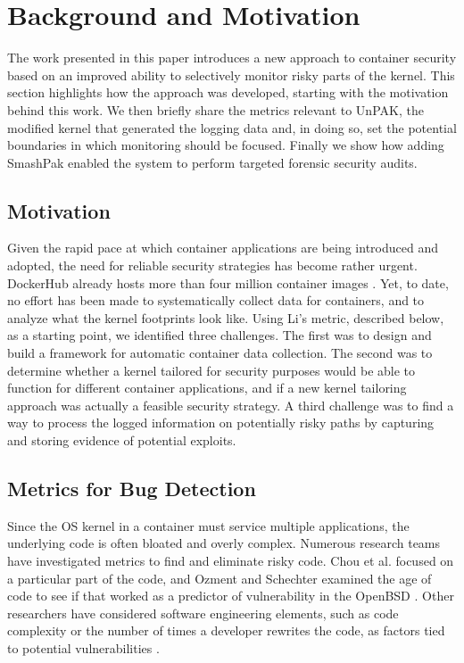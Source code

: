 \section{Background and Motivation}
\label{sec.motivation}
The work presented in this paper introduces a new approach to container security based on an improved ability to selectively monitor risky parts of the kernel. 
This section highlights how the approach was developed, starting with the motivation behind this work. We then briefly share the metrics relevant to UnPAK, 
the modified kernel that generated the logging data and, in doing so, set the potential boundaries in which monitoring should be focused. 
Finally we show how adding SmashPak enabled the system to perform targeted forensic security audits.

\subsection{Motivation}
\label{sec.motivation.motivation}
Given the rapid pace at which container applications are being introduced and adopted, the need for reliable security strategies has become rather urgent. 
DockerHub already hosts more than four million container images \cite{DockerHub}. 
Yet, to date, no effort has been made to systematically collect data for containers, and to analyze what the kernel footprints look like. 
Using Li’s metric, described below, as a starting point,  we identified three challenges. The first was to design and build a framework for automatic container data collection.  
The second was to determine whether a kernel tailored for security purposes would  be able to function for different container applications, 
and if a new kernel tailoring approach was actually a feasible security strategy. 
A third challenge was to find a way to process the logged information on potentially risky paths by capturing and storing evidence of potential exploits. 

\subsection{Metrics for Bug Detection}
\label{sec.motivation.metrics}
Since the OS kernel in a container must service multiple applications, the underlying code is often bloated and overly complex. 
Numerous research teams have investigated metrics to find and eliminate risky code. 
Chou et al. \cite{Chou} focused on a particular part of the code, 
and Ozment and Schechter \cite{Ozment} examined the age of code to see if that worked as a predictor of vulnerability in the OpenBSD \cite{OpenBSD}. 
Other researchers have considered software engineering elements, such as code complexity or the number of times a developer rewrites the code, 
as factors tied to potential vulnerabilities \cite{5560680, SAC10, Imtiaz2018TowardsDV, 4459644, Alenezi2015EvaluatingSM}. 

